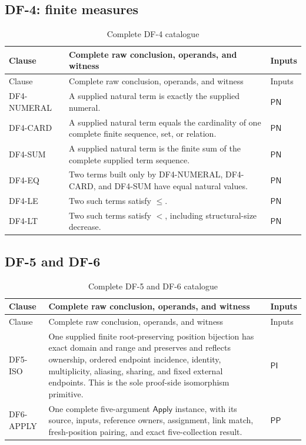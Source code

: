 \documentclass[11pt,twoside]{article}
\newcommand{\Apply}{\mathsf{Apply}}
\begin{document}
\subsection{DF-4: finite measures}\label{sec:df4}

\begin{longtable}{>{\raggedright\arraybackslash}p{}
                  >{\raggedright\arraybackslash}p{}
                  >{\raggedright\arraybackslash}p{}}
\caption{Complete DF-4 catalogue}\label{tab:df4}\\
\toprule
Clause & Complete raw conclusion, operands, and witness & Inputs\\
\midrule
\endfirsthead%
\toprule
Clause & Complete raw conclusion, operands, and witness & Inputs\\
\midrule
\endhead%
DF4-NUMERAL & A supplied natural term is exactly the supplied numeral. &
\(\mathsf{PN}\)\\
DF4-CARD & A supplied natural term equals the cardinality of one complete finite
sequence, set, or relation. & \(\mathsf{PN}\)\\
DF4-SUM & A supplied natural term is the finite sum of the complete supplied term
sequence. & \(\mathsf{PN}\)\\
DF4-EQ & Two terms built only by DF4-NUMERAL, DF4-CARD, and DF4-SUM have equal
natural values. & \(\mathsf{PN}\)\\
DF4-LE & Two such terms satisfy \(\leq\). & \(\mathsf{PN}\)\\
DF4-LT & Two such terms satisfy \(<\), including structural-size decrease. &
\(\mathsf{PN}\)\\
\bottomrule
\end{longtable}

\subsection{DF-5 and DF-6}\label{sec:df56}

\begin{longtable}{>{\raggedright\arraybackslash}p{}
                  >{\raggedright\arraybackslash}p{}
                  >{\raggedright\arraybackslash}p{}}
\caption{Complete DF-5 and DF-6 catalogue}\label{tab:df6}\\
\toprule
Clause & Complete raw conclusion, operands, and witness & Inputs\\
\midrule
\endfirsthead%
\toprule
Clause & Complete raw conclusion, operands, and witness & Inputs\\
\midrule
\endhead%
DF5-ISO & One supplied finite root-preserving position bijection has exact domain
and range and preserves and reflects ownership, ordered endpoint incidence,
identity, multiplicity, aliasing, sharing, and fixed external endpoints.  This is
the sole proof-side isomorphism primitive. & \(\mathsf{PI}\)\\
DF6-APPLY & One complete five-argument \(\Apply\) instance, with its source,
inputs, reference owners, assignment, link match, fresh-position pairing, and
exact five-collection result. & \(\mathsf{PP}\)\\
\bottomrule
\end{longtable}
\end{document}
